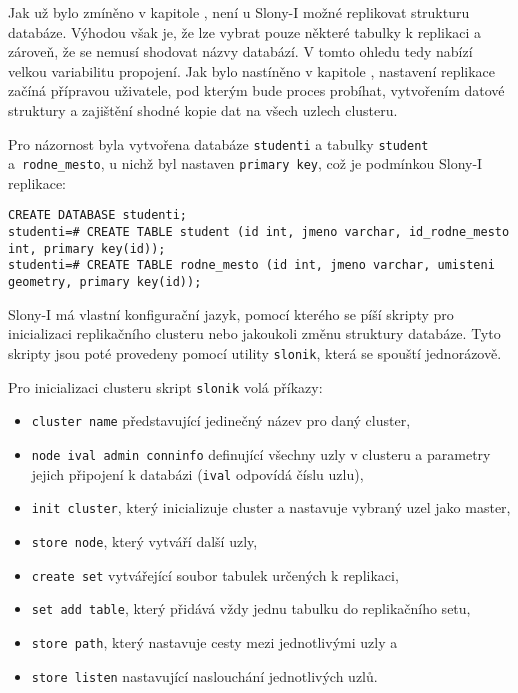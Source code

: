 Jak už bylo zmíněno v kapitole , není u Slony-I možné
replikovat strukturu databáze. Výhodou však je, že lze vybrat pouze některé
tabulky k replikaci a zároveň, že se nemusí shodovat názvy databází. V tomto
ohledu tedy nabízí velkou variabilitu propojení. Jak bylo nastíněno v kapitole
, nastavení replikace začíná přípravou uživatele, pod
kterým bude proces probíhat, vytvořením datové struktury a zajištění shodné
kopie dat na všech uzlech clusteru.

Pro názornost byla vytvořena databáze \texttt{studenti} a tabulky
\texttt{student} a~\texttt{rodne\_mesto}, u nichž byl nastaven \texttt{primary
key}, což je podmínkou Slony-I replikace:

\begin{lstlisting}
CREATE DATABASE studenti;
studenti=# CREATE TABLE student (id int, jmeno varchar, id_rodne_mesto int, primary key(id));
studenti=# CREATE TABLE rodne_mesto (id int, jmeno varchar, umisteni geometry, primary key(id));
\end{lstlisting}

Slony-I má vlastní konfigurační jazyk, pomocí kterého se píší skripty pro inicializaci 
replikačního clusteru nebo jakoukoli změnu struktury databáze. Tyto skripty
jsou poté provedeny pomocí utility \texttt{slonik}, která se spouští
jednorázově.

Pro inicializaci clusteru skript \texttt{slonik} volá příkazy:
\begin{itemize}
  \item \texttt{cluster name} představující jedinečný název pro daný cluster,
  \item \texttt{node ival admin conninfo} definující všechny uzly v clusteru a
    parametry jejich připojení k databázi (\texttt{ival} odpovídá číslu uzlu),
  \item \texttt{init cluster}, který inicializuje cluster a nastavuje vybraný
    uzel jako master,
  \item \texttt{store node}, který vytváří další uzly,
  \item \texttt{create set} vytvářející soubor tabulek určených k replikaci,
  \item \texttt{set add table}, který přidává vždy jednu tabulku do replikačního
    setu,
  \item \texttt{store path}, který nastavuje cesty mezi jednotlivými uzly a
  \item \texttt{store listen} nastavující naslouchání jednotlivých uzlů.
\end{itemize}

